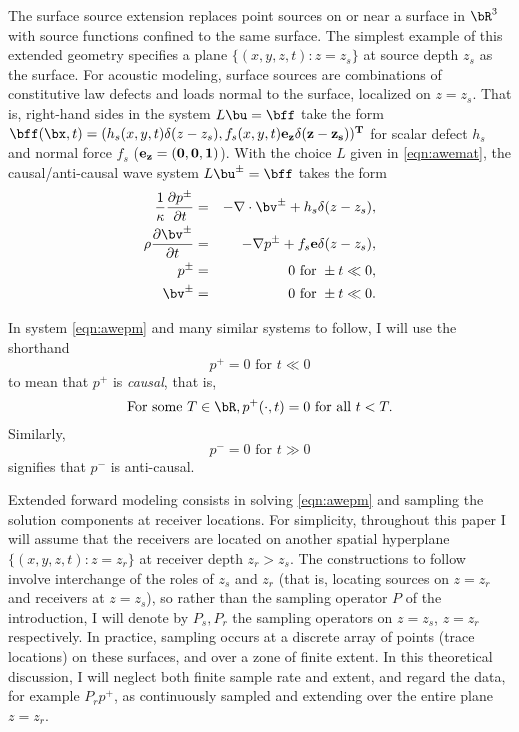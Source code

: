 The surface source extension replaces point sources on or near a
surface in $\bR^3$ with source functions confined to the same
surface. The simplest example of this extended geometry specifies a
plane $\{(x,y,z,t): z=z_s\}$ at source depth $z_s$ as the surface. For
acoustic modeling, surface sources are combinations of constitutive law
defects and loads normal to the surface, localized on $z=z_s$. That
is, right-hand sides in the system $L\bu=\bff$ take the form
$\bff(\bx,t) = (h_s(x,y,t)\delta(z-z_s),
f_s(x,y,t)\bf{e}_z\delta(z-z_s))^T$ for scalar defect $h_s$ and normal
force $f_s$ ($\bf{e}_z=(0,0,1)$). With the choice $L$ given in
\ref{eqn:awemat}, the causal/anti-causal wave system $L\bu^{\pm}=\bff$
takes the form
\begin{eqnarray}
\label{eqn:awepm}
\frac{1}{\kappa}\frac{\partial p^{\pm}}{\partial t} & = & - \nabla \cdot \bv^{\pm} +
h_s \delta(z-z_s), \nonumber \\
\rho\frac{\partial \bv^{\pm}}{\partial t} & = & - \nabla p^{\pm} +
                                                f_s{\bf e} \delta(z-z_s),\nonumber \\
p^{\pm} & =& 0 \mbox{ for } \pm t \ll 0,\nonumber\\ 
\bv^{\pm} & = & 0 \mbox{ for } \pm t \ll 0.
\end{eqnarray}

 In system \ref{eqn:awepm} and many similar
systems to follow, I will use the shorthand
\[
  p^+ = 0 \mbox{ for } t \ll 0 
\]
to mean that $p^+$ is {\em causal}, that is,
\[
  \mbox{For some } T \in \bR, p^+(\cdot,t) = 0 \mbox{ for all } t <
  T.
\]
Similarly,
\[
  p^- = 0 \mbox{ for } t \gg 0 
\]
signifies that $p^-$ is anti-causal.

Extended forward modeling consists in solving \ref{eqn:awepm} and
sampling the solution components at receiver locations. For
simplicity, throughout this paper I will assume that the receivers are
located on another spatial hyperplane $\{(x,y,z,t): z=z_r\}$ at
receiver depth $z_r>z_s$. The constructions to follow involve interchange
of the roles of $z_s$ and $z_r$ (that is, locating sources on $z=z_r$
and receivers at $z=z_s$), so rather than the sampling operator $P$ of
the introduction, I will denote by $P_s,P_r$ the sampling 
operators on $z=z_s$, $z=z_r$ respectively. In practice, sampling
occurs at a discrete array of points (trace locations) on these
surfaces, and over a zone of finite extent. In this theoretical
discussion, I will neglect both finite sample rate and extent, and
regard the data, for example $P_rp^+$, as continuously sampled and
extending over the entire plane $z=z_r$.

